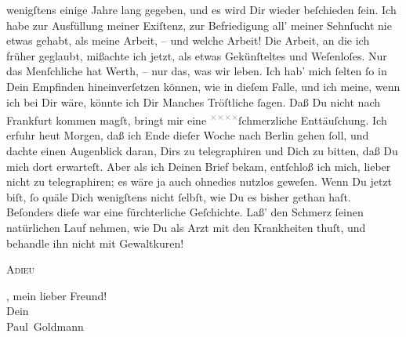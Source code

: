 \begin{ledgroupsized}[t]{13cm}
               wenigſtens einige Jahre lang gegeben, und es wird Dir \strikeout{\textcolor{gray}{wie}} wieder beſchieden ſein. Ich habe zur Ausfüllung meiner Exiſtenz, zur
               Befriedigung all’ meiner Sehnſucht nie etwas gehabt, als meine Arbeit, – und welche
               Arbeit! Die Arbeit, an die ich früher geglaubt, mißachte ich jetzt, als etwas
               Gekünſteltes und Weſenloſes. Nur das Menſchliche hat Werth, – nur das, was wir
               leben.\pend
           \pstart
           Ich hab’ mich ſelten ſo in Dein \strikeout{\textcolor{gray}{×}}{ }{\pb}Empfinden hineinverſetzen können, wie \strikeout{\textcolor{gray}{gege}} in dieſem Falle, und ich meine, wenn ich bei Dir wäre, könnte ich Dir \strikeout{\textcolor{gray}{m}} Manches Tröſtliche ſagen. Daß Du nicht nach Frankfurt kommen magſt, bringt mir eine \substVorne{}\textsuperscript{\textcolor{gray}{×}\-\textcolor{gray}{×}\-\textcolor{gray}{×}\-\textcolor{gray}{×}}\substDazwischen{}ſchmerzliche\substHinten{} Enttäuſchung. Ich erfuhr heut{ }Morgen, daß ich Ende dieſer Woche nach Berlin gehen ſoll, und dachte einen Augenblick daran, Dirs zu telegraphiren
               und \introOben{}Dich\introOben{} zu bitten,  daß
               Du mich dort erwarteſt. Aber  als ich Deinen Brief bekam, entſchloß ich mich, lieber nicht zu telegraphiren;
               es wäre ja auch ohnedies nutzlos geweſen.\pend
           \pstart
           Wenn Du jetzt \label{K_L02874-3v}\label{K_L02874-3h}{ } biſt, ſo quäle Dich
               wenigſtens nicht ſelbſt, wie Du es bisher gethan haſt. Beſonders {\pb}dieſe \label{K_L02874-4v}\label{K_L02874-4h} war eine fürchterliche Geſchichte. Laß’ den Schmerz ſeinen natürlichen Lauf
               nehmen, wie Du als Arzt mit den Krankheiten thuſt, und behandle ihn nicht mit
               Gewaltkuren!\pend
           \pstart
           \begin{otherlanguage}{french}\textsc{Adieu}\end{otherlanguage}, mein lieber Freund! {\\[\baselineskip]}Dein {\\[\baselineskip]}\spacefill\mbox{Paul Goldmann}\pend

\end{ledgroupsized}
